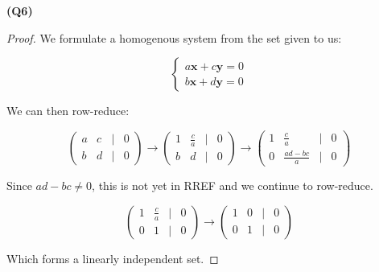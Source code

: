 \documentclass[12pt, a4paper]{article}
\begin{document}
\textbf{(Q6)}

\begin{proof}
    We formulate a homogenous system from the set given to us:

    \[
        \begin{cases}
            a\mathbf{x} + c\mathbf{y} = 0\\
            b\mathbf{x} + d\mathbf{y} = 0
        \end{cases}
    \]

    We can then row-reduce:

    \[
        \begin{pmatrix}
            a & c & \vert & 0\\
            b & d & \vert & 0
        \end{pmatrix}
        \rightarrow
        \begin{pmatrix}
            1 & \frac{c}{a} & \vert & 0\\
            b & d & \vert & 0
        \end{pmatrix}
        \rightarrow
        \begin{pmatrix}
            1 & \frac{c}{a} & \vert & 0\\
            0 & \frac{ad - bc}{a} & \vert & 0
        \end{pmatrix}
    \]

    Since $ad - bc \neq 0$, this is not yet in RREF and we continue
    to row-reduce.

    \[
        \begin{pmatrix}
            1 & \frac{c}{a} & \vert & 0\\
            0 & 1 & \vert & 0
        \end{pmatrix}
        \rightarrow
        \begin{pmatrix}
            1 & 0 & \vert & 0\\
            0 & 1 & \vert & 0
        \end{pmatrix}
    \]

    Which forms a linearly independent set.
\end{proof}
\end{document}
